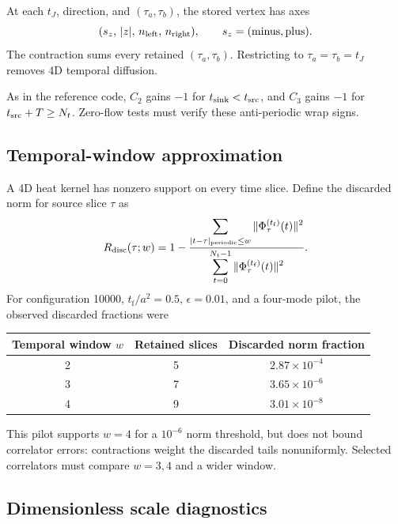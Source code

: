 \documentclass[11pt]{article}
\numberwithin{equation}{section}
\newcommand{\tf}{t_{\mathrm f}}
\begin{document}
At each \(t_J\), direction, and \((\tau_a,\tau_b)\), the stored vertex has
axes
\begin{equation}
  (s_z,\,|z|,\,n_{\rm left},\,n_{\rm right}),
  \qquad
  s_z=(\text{minus},\text{plus}).
\end{equation}
The contraction sums every retained \((\tau_a,\tau_b)\). Restricting to
\(\tau_a=\tau_b=t_J\) removes 4D temporal diffusion.

As in the reference code, \(C_2\) gains \(-1\) for
\(t_{\rm sink}<t_{\rm src}\), and \(C_3\) gains \(-1\) for
\(t_{\rm src}+T\geq N_t\). Zero-flow tests must verify these anti-periodic
wrap signs.

\subsection{Temporal-window approximation}

A 4D heat kernel has nonzero support on every time slice. Define the discarded
norm for source slice \(\tau\) as
\begin{equation}
  R_{\rm disc}(\tau;w)
  =1-
  \frac{\displaystyle
    \sum_{|t-\tau|_{\rm periodic}\leq w}
    \|\Phi_{\tau}^{(\tf)}(t)\|^2}
  {\displaystyle
    \sum_{t=0}^{N_t-1}\|\Phi_{\tau}^{(\tf)}(t)\|^2}.
  \label{eq:discarded-norm}
\end{equation}
For configuration 10000, \(\tf/a^2=0.5\), \(\epsilon=0.01\), and a
four-mode pilot, the observed discarded fractions were
\begin{center}
\begin{tabular}{ccc}
  \toprule
  Temporal window \(w\) & Retained slices & Discarded norm fraction \\
  \midrule
  2 & 5 & \(2.87\times10^{-4}\) \\
  3 & 7 & \(3.65\times10^{-6}\) \\
  4 & 9 & \(3.01\times10^{-8}\) \\
  \bottomrule
\end{tabular}
\end{center}
This pilot supports \(w=4\) for a \(10^{-6}\) norm threshold, but does not
bound correlator errors: contractions weight the discarded tails
nonuniformly. Selected correlators must compare \(w=3,4\) and a wider window.

\subsection{Dimensionless scale diagnostics}
\end{document}
